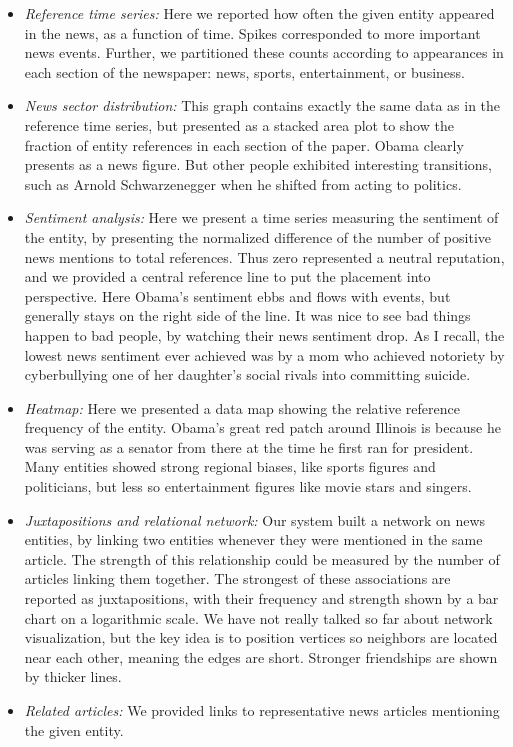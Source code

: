 \documentclass[10pt]{article}
\begin{document}
\begin{itemize}
  \item \textit{Reference time series:} Here we reported how often the given entity appeared in the news, as a function of time. Spikes corresponded to more important news events. Further, we partitioned these counts according to appearances in each section of the newspaper: news, sports, entertainment, or business.
  \item \textit{News sector distribution:} This graph contains exactly the same data as in the reference time series, but presented as a stacked area plot to show the fraction of entity references in each section of the paper. Obama clearly presents as a news figure. But other people exhibited interesting transitions, such as Arnold Schwarzenegger when he shifted from acting to politics.
  \item \textit{Sentiment analysis:} Here we present a time series measuring the sentiment of the entity, by presenting the normalized difference of the number of positive news mentions to total references. Thus zero represented a neutral reputation, and we provided a central reference line to put the placement into perspective. Here Obama's sentiment ebbs and flows with events, but generally stays on the right side of the line. It was nice to see bad things happen to bad people, by watching their news sentiment drop. As I recall, the lowest news sentiment ever achieved was by a mom who achieved notoriety by cyberbullying one of her daughter's social rivals into committing suicide.
  \item \textit{Heatmap:} Here we presented a data map showing the relative reference frequency of the entity. Obama's great red patch around Illinois is because he was serving as a senator from there at the time he first ran for president. Many entities showed strong regional biases, like sports figures and politicians, but less so entertainment figures like movie stars and singers.
  \item \textit{Juxtapositions and relational network:} Our system built a network on news entities, by linking two entities whenever they were mentioned in the same article. The strength of this relationship could be measured by the number of articles linking them together. The strongest of these associations are reported as juxtapositions, with their frequency and strength shown by a bar chart on a logarithmic scale. We have not really talked so far about network visualization, but the key idea is to position vertices so neighbors are located near each other, meaning the edges are short. Stronger friendships are shown by thicker lines.
  \item \textit{Related articles:} We provided links to representative news articles mentioning the given entity.
\end{itemize}
\end{document}
